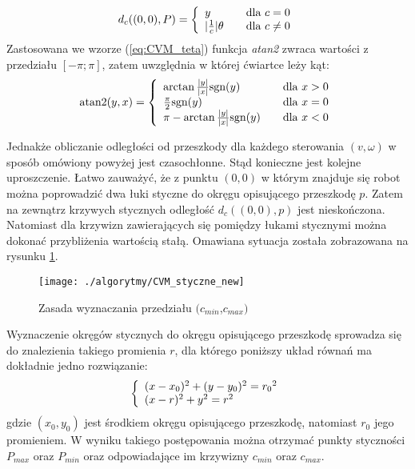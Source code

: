 	\begin{equation}
	d_c((0,0),P)= \left\{ 
	\begin{array}{l l}
  	y& \quad \mbox{dla $c=0$}\\
  	|\frac{1}{c}|\theta & \quad \mbox{dla $c\neq0$}\\
	\end{array} \right. 
	\end{equation}
	Zastosowana we wzorze (\ref{eq:CVM_teta}) funkcja \emph{atan2} zwraca wartości z przedziału $[-\pi;\pi]$, zatem uwzględnia w której ćwiartce leży kąt:
	\begin{equation}\label{eq:atan2}
	\text{atan2}(y,x)= \left\{ 
	\begin{array}{l l}
	\arctan{\frac{|y|}{|x|}} \text{sgn}{(y)} & \quad \mbox{dla $x>0$}\\
	\frac{\pi}{2}\text{sgn}{(y)} & \quad \mbox{dla $x=0$}\\
	\pi-\arctan{\frac{|y|}{|x|}} \text{sgn}{(y)} & \quad \mbox{dla $x<0$}\\
	\end{array} \right. 
	\end{equation}
	
	Jednakże obliczanie odległości od przeszkody dla każdego sterowania $(v,\omega)$ w sposób omówiony powyżej
	jest czasochłonne. Stąd konieczne jest kolejne uproszczenie. Łatwo zauważyć, że z punktu $(0,0)$ w którym
	znajduje się robot można poprowadzić dwa łuki styczne do okręgu opisującego przeszkodę $p$. Zatem na zewnątrz
	krzywych stycznych odległość  $d_c((0,0),p)$ jest nieskończona. Natomiast dla krzywizn zawierających się
	pomiędzy łukami stycznymi można dokonać przybliżenia wartością stałą. Omawiana sytuacja została zobrazowana na
	rysunku \ref{fig:CVM_styczne}.
	\begin{figure}[!h]
	\centering
	\texttt{[image: ./algorytmy/CVM\_styczne\_new]}
	\caption{ Zasada wyznaczania przedziału $(c_{min}$,$c_{max})$ \label{fig:CVM_styczne}}
	\end{figure}
	Wyznaczenie okręgów stycznych do okręgu opisującego przeszkodę sprowadza się do znalezienia takiego promienia $r$, dla którego
	poniższy układ równań ma dokładnie jedno rozwiązanie:
	\begin{equation}\label{eq:CVM_styczne}
	 \left\{ 
	\begin{array}{l l}
  	(x-x_0)^2 + (y-y_0)^2={r_0}^2\\
  	 (x-r)^2 + y^2={r}^2\\
	\end{array} \right. 
	\end{equation}
	gdzie $(x_0,y_0)$ jest środkiem okręgu opisującego przeszkodę, natomiast $r_0$ jego promieniem.
	W wyniku takiego postępowania można otrzymać punkty styczności $P_{max}$ oraz $P_{min}$ oraz odpowiadające im krzywizny $c_{min}$ oraz $c_{max}$. 
	
